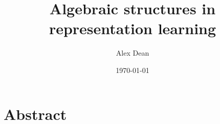 \documentclass[justified]{LaTeX/tufte-book}
\title{Algebraic structures in representation learning}
\author{Alex Dean}
\date{\today}
\begin{document}
\maketitle

\doublespacing
\frontmatter

\begin{fullwidth}
    \tableofcontents
\end{fullwidth}

\begin{fullwidth}
    \listoffigures
    \listoftables
\end{fullwidth}

\chapter{Abstract}


\mainmatter










\begin{appendices}
    \setappendixformat
    
    
\end{appendices}

\backmatter
\begin{fullwidth}
	\printbibliography
\end{fullwidth}
\end{document}
